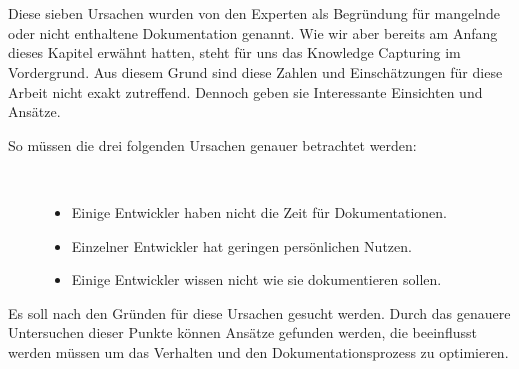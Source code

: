 \documentclass[a4paper,12pt]{scrartcl}
\begin{document}
\\\\
Diese sieben Ursachen wurden von den Experten als Begründung für mangelnde oder nicht enthaltene Dokumentation genannt. Wie wir aber bereits am Anfang dieses Kapitel erwähnt hatten, steht für uns das Knowledge Capturing im Vordergrund. Aus diesem Grund sind diese Zahlen und Einschätzungen für diese Arbeit nicht exakt zutreffend. Dennoch geben sie Interessante Einsichten und Ansätze.    
\begin{description}
   \item[So müssen die drei folgenden Ursachen genauer betrachtet werden:]~\par
   \begin{itemize}
      \item Einige Entwickler haben nicht die Zeit für Dokumentationen.
      \item Einzelner Entwickler hat geringen persönlichen Nutzen.
      \item Einige Entwickler wissen nicht wie sie dokumentieren sollen.
   \end{itemize}
\end{description}
Es soll nach den Gründen für diese Ursachen gesucht werden. Durch das genauere Untersuchen dieser Punkte können Ansätze gefunden werden, die beeinflusst werden müssen um das Verhalten und den Dokumentationsprozess zu optimieren. 
\end{document}

